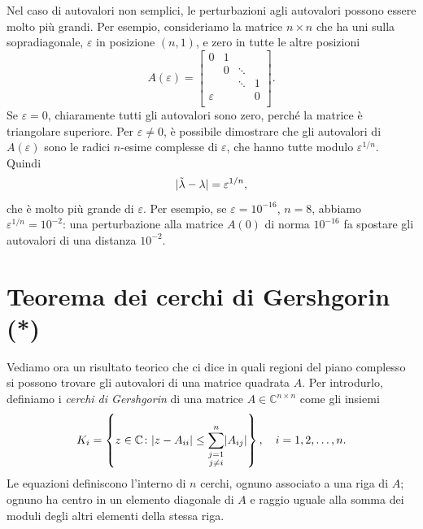 \documentclass[a4paper]{report}
\DeclarePairedDelimiter{\abs}{\lvert}{\rvert}
\theoremstyle{definition}
\theoremstyle{remark}
\begin{document}
Nel caso di autovalori non semplici, le perturbazioni agli autovalori possono essere molto più grandi. Per esempio, consideriamo la matrice $n\times n$ che ha uni sulla sopradiagonale, $\varepsilon$ in posizione $(n,1)$, e zero in tutte le altre posizioni
\[
A(\varepsilon) = \begin{bmatrix}
    0 & 1\\
    & 0 & \ddots\\
    & & \ddots & 1\\
    \varepsilon & & &  0\\
\end{bmatrix}.
\]
Se $\varepsilon=0$, chiaramente tutti gli autovalori sono zero, perché la matrice è triangolare superiore. Per $\varepsilon \neq 0$, è possibile dimostrare che gli autovalori di $A(\varepsilon)$ sono le radici $n$-esime complesse di $\varepsilon$, che hanno tutte modulo $\varepsilon^{1/n}$. Quindi
\[
\abs{\tilde{\lambda} - \lambda} = \varepsilon^{1/n},
\]
che è molto più grande di $\varepsilon$. Per esempio, se $\varepsilon=10^{-16}$, $n=8$, abbiamo $\varepsilon^{1/n} = 10^{-2}$: una perturbazione alla matrice $A(0)$ di norma $10^{-16}$ fa spostare gli autovalori di una distanza $10^{-2}$.

\section{Teorema dei cerchi di Gershgorin (*)}

Vediamo ora un risultato teorico che ci dice in quali regioni del piano complesso si possono trovare gli autovalori di una matrice quadrata $A$. Per introdurlo, definiamo i \emph{cerchi di Gershgorin} di una matrice $A\in\mathbb{C}^{n\times n}$ come gli insiemi
\[
K_i = \left\{z\in \mathbb{C} \colon \abs{z - A_{ii}} \leq \sum_{\substack{j=1\\ j \neq i}}^n \abs{A_{ij}} \right\}, \quad i=1,2,\dots,n.
\]
Le equazioni definiscono l'interno di $n$ cerchi, ognuno associato a una riga di $A$; ognuno ha centro in un elemento diagonale di $A$ e raggio uguale alla somma dei moduli degli altri elementi della stessa riga.
\end{document}
